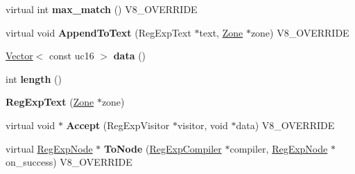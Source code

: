 \begin{DoxyCompactItemize}
\item 
\hypertarget{classv8_1_1internal_1_1_v8___f_i_n_a_l_a0b9dd74bfd4f1172c26a072c44da8669}{}virtual int {\bfseries max\+\_\+match} () V8\+\_\+\+O\+V\+E\+R\+R\+I\+D\+E\label{classv8_1_1internal_1_1_v8___f_i_n_a_l_a0b9dd74bfd4f1172c26a072c44da8669}

\item 
\hypertarget{classv8_1_1internal_1_1_v8___f_i_n_a_l_a1f8586ff5e4b913358f02f3c88eff2e3}{}virtual void {\bfseries Append\+To\+Text} (Reg\+Exp\+Text $\ast$text, \hyperlink{classv8_1_1internal_1_1_zone}{Zone} $\ast$zone) V8\+\_\+\+O\+V\+E\+R\+R\+I\+D\+E\label{classv8_1_1internal_1_1_v8___f_i_n_a_l_a1f8586ff5e4b913358f02f3c88eff2e3}

\item 
\hypertarget{classv8_1_1internal_1_1_v8___f_i_n_a_l_aee1409b29ab67842aff76cf23bdc05ad}{}\hyperlink{classv8_1_1internal_1_1_vector}{Vector}$<$ const uc16 $>$ {\bfseries data} ()\label{classv8_1_1internal_1_1_v8___f_i_n_a_l_aee1409b29ab67842aff76cf23bdc05ad}

\item 
\hypertarget{classv8_1_1internal_1_1_v8___f_i_n_a_l_afea2856b778251b53e626dd25892624a}{}int {\bfseries length} ()\label{classv8_1_1internal_1_1_v8___f_i_n_a_l_afea2856b778251b53e626dd25892624a}

\item 
\hypertarget{classv8_1_1internal_1_1_v8___f_i_n_a_l_a2da2bdcac7245a9be5d0e9724da63581}{}{\bfseries Reg\+Exp\+Text} (\hyperlink{classv8_1_1internal_1_1_zone}{Zone} $\ast$zone)\label{classv8_1_1internal_1_1_v8___f_i_n_a_l_a2da2bdcac7245a9be5d0e9724da63581}

\item 
\hypertarget{classv8_1_1internal_1_1_v8___f_i_n_a_l_a5a421cb811caf33f244ce08fe3e5ac14}{}virtual void $\ast$ {\bfseries Accept} (Reg\+Exp\+Visitor $\ast$visitor, void $\ast$data) V8\+\_\+\+O\+V\+E\+R\+R\+I\+D\+E\label{classv8_1_1internal_1_1_v8___f_i_n_a_l_a5a421cb811caf33f244ce08fe3e5ac14}

\item 
\hypertarget{classv8_1_1internal_1_1_v8___f_i_n_a_l_aa183d4adede0c6af0c092eeebf59c194}{}virtual \hyperlink{classv8_1_1internal_1_1_reg_exp_node}{Reg\+Exp\+Node} $\ast$ {\bfseries To\+Node} (\hyperlink{classv8_1_1internal_1_1_reg_exp_compiler}{Reg\+Exp\+Compiler} $\ast$compiler, \hyperlink{classv8_1_1internal_1_1_reg_exp_node}{Reg\+Exp\+Node} $\ast$on\+\_\+success) V8\+\_\+\+O\+V\+E\+R\+R\+I\+D\+E\label{classv8_1_1internal_1_1_v8___f_i_n_a_l_aa183d4adede0c6af0c092eeebf59c194}


\end{DoxyCompactItemize}
